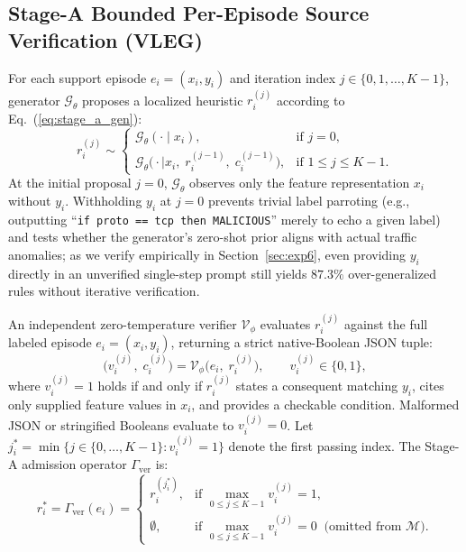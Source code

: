 \documentclass[11pt,letterpaper,onecolumn]{article}
\begin{document}
\subsection{Stage-A Bounded Per-Episode Source Verification (VLEG)}
For each support episode $e_i = (x_i, y_i)$ and iteration index $j \in \{0, 1, \dots, K-1\}$, generator $\mathcal{G}_\theta$ proposes a localized heuristic $r_i^{(j)}$ according to Eq.~(\ref{eq:stage_a_gen}):
\begin{equation}
\label{eq:stage_a_gen}
    r_i^{(j)} \sim \begin{cases}
        \mathcal{G}_\theta(\cdot \mid x_i), & \text{if } j = 0, \\[3pt]
        \mathcal{G}_\theta\big(\cdot \mid x_i,\; r_i^{(j-1)},\; c_i^{(j-1)}\big), & \text{if } 1 \le j \le K-1.
    \end{cases}
\end{equation}
At the initial proposal $j = 0$, $\mathcal{G}_\theta$ observes only the feature representation $x_i$ without $y_i$. Withholding $y_i$ at $j = 0$ prevents trivial label parroting (e.g., outputting ``\texttt{if proto == tcp then MALICIOUS}'' merely to echo a given label) and tests whether the generator's zero-shot prior aligns with actual traffic anomalies; as we verify empirically in Section~\ref{sec:exp6}, even providing $y_i$ directly in an unverified single-step prompt still yields $87.3\%$ over-generalized rules without iterative verification.

An independent zero-temperature verifier $\mathcal{V}_\phi$ evaluates $r_i^{(j)}$ against the full labeled episode $e_i = (x_i, y_i)$, returning a strict native-Boolean JSON tuple:
\begin{equation}
\label{eq:stage_a_ver}
    \big(v_i^{(j)},\; c_i^{(j)}\big) = \mathcal{V}_\phi\big(e_i,\; r_i^{(j)}\big), \qquad v_i^{(j)} \in \{0, 1\},
\end{equation}
where $v_i^{(j)} = 1$ holds if and only if $r_i^{(j)}$ states a consequent matching $y_i$, cites only supplied feature values in $x_i$, and provides a checkable condition. Malformed JSON or stringified Booleans evaluate to $v_i^{(j)} = 0$. Let $j_i^* = \min\{j \in \{0, \dots, K-1\} : v_i^{(j)} = 1\}$ denote the first passing index. The Stage-A admission operator $\Gamma_{\mathrm{ver}}$ is:
\begin{equation}
\label{eq:stage_a_gate}
    r_i^* = \Gamma_{\mathrm{ver}}(e_i) = \begin{cases}
        r_i^{(j_i^*)}, & \text{if } \max_{0 \le j \le K-1} v_i^{(j)} = 1, \\[4pt]
        \emptyset, & \text{if } \max_{0 \le j \le K-1} v_i^{(j)} = 0 \;\; \text{(omitted from } \mathcal{M}\text{)}.
    \end{cases}
\end{equation}
\end{document}
